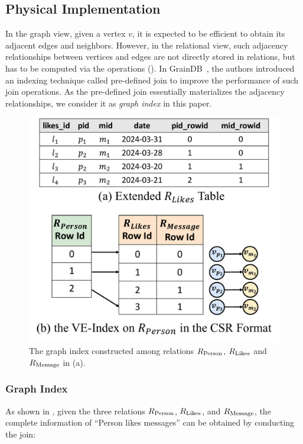 \subsection{Physical Implementation}
\label{sec:physical-operators}

In the graph view, given a vertex $v$, it is expected to be efficient to obtain its adjacent edges and neighbors. However, in the relational view, such adjacency relationships between vertices and edges are not directly stored in relations, but has to be computed via the \EVjoin operations (). In GrainDB~\cite{graindb}, the authors introduced an indexing technique called pre-defined join to improve the performance of such join operations. As the pre-defined join essentially materializes the adjacency relationships, we consider it as \emph{graph index} in this paper.

\begin{figure}
    \centering
    \includegraphics[width=.8\linewidth]{./figures/graph-index-likes.pdf}
    \caption{The graph index constructed among relations ${R_{\text{Person}}}$, ${R_{\text{Likes}}}$
    and ${R_{\text{Message}}}$ in (a).}
    \label{fig:graph-index}
\end{figure}

\subsubsection{Graph Index}
\label{sec:graph-index}

As shown in , given the three relations ${R_{\text{Person}}}$, ${R_{\text{Likes}}}$, and ${R_{\text{Message}}}$, the complete information of ``Person likes messages'' can be obtained by conducting the join:

